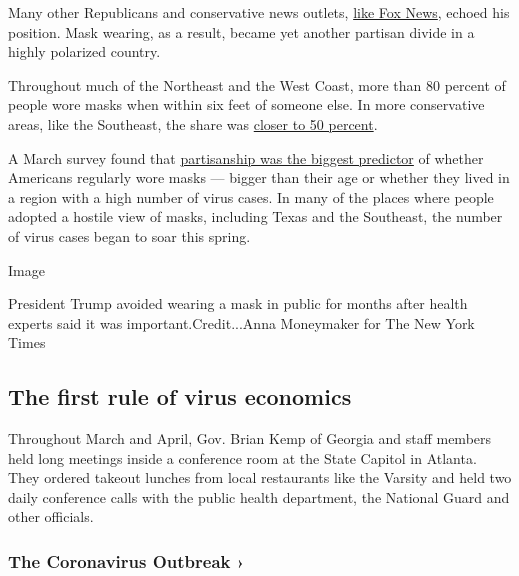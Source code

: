 Many other Republicans and conservative news outlets,
\href{https://www.mediamatters.org/fox-news/foxs-ongoing-attacks-masks-are-public-health-menace}{like
Fox News}, echoed his position. Mask wearing, as a result, became yet
another partisan divide in a highly polarized country.

Throughout much of the Northeast and the West Coast, more than 80
percent of people wore masks when within six feet of someone else. In
more conservative areas, like the Southeast, the share was
\href{https://www.nytimes.com/interactive/2020/07/17/upshot/coronavirus-face-mask-map.html}{closer
to 50 percent}.

A March survey found that
\href{https://www.vox.com/science-and-health/2020/3/31/21199271/coronavirus-in-us-trump-republicans-democrats-survey-epistemic-crisis}{partisanship
was the biggest predictor} of whether Americans regularly wore masks ---
bigger than their age or whether they lived in a region with a high
number of virus cases. In many of the places where people adopted a
hostile view of masks, including Texas and the Southeast, the number of
virus cases began to soar this spring.

Image

President Trump avoided wearing a mask in public for months after health
experts said it was important.Credit...Anna Moneymaker for The New York
Times

\hypertarget{the-first-rule-of-virus-economics}{%
\subsection{The first rule of virus
economics}\label{the-first-rule-of-virus-economics}}

Throughout March and April, Gov. Brian Kemp of Georgia and staff members
held long meetings inside a conference room at the State Capitol in
Atlanta. They ordered takeout lunches from local restaurants like the
Varsity and held two daily conference calls with the public health
department, the National Guard and other officials.

\href{https://www.nytimes.com/news-event/coronavirus?action=click\&pgtype=Article\&state=default\&region=MAIN_CONTENT_3\&context=storylines_faq}{}

\hypertarget{the-coronavirus-outbreak-}{%
\subsubsection{The Coronavirus Outbreak
›}\label{the-coronavirus-outbreak-}}

